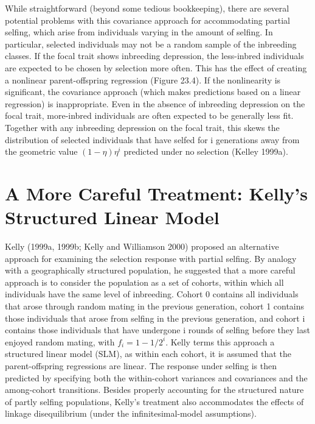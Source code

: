 \documentclass{article}
\begin{document}
While straightforward (beyond some tedious bookkeeping), there are several potential problems with this covariance approach for accommodating partial selfing, which arise from individuals varying in the amount of selfing. In particular, selected individuals may not be a random sample of the inbreeding classes. If the focal trait shows inbreeding depression, the less-inbred individuals are expected to be chosen by selection more often. This has the effect of creating a nonlinear parent-offspring regression (Figure 23.4). If the nonlinearity is significant, the covariance approach (which makes predictions based on a linear regression) is inappropriate. Even in the absence of inbreeding depression on the focal trait, more-inbred individuals are often expected to be generally less fit. Together with any inbreeding depression on the focal trait, this skews the distribution of selected individuals that have selfed for i generations away from the geometric value  $ (1-\eta)\eta^{i} $ predicted under no selection (Kelley 1999a).

\section{A More Careful Treatment: Kelly's Structured Linear Model}
Kelly (1999a, 1999b; Kelly and Williamson 2000) proposed an alternative approach for examining the selection response with partial selfing. By analogy with a geographically structured population, he suggested that a more careful approach is to consider the population as a set of cohorts, within which all individuals have the same level of inbreeding. Cohort 0 contains all individuals that arose through random mating in the previous generation, cohort 1 contains those individuals that arose from selfing in the previous generation, and cohort i contains those individuals that have undergone i rounds of selfing before they last enjoyed random mating, with  $ f_i = 1 - 1/2^i $. Kelly terms this approach a structured linear model (SLM), as within each cohort, it is assumed that the parent-offspring regressions are linear. The response under selfing is then predicted by specifying both the within-cohort variances and covariances and the among-cohort transitions. Besides properly accounting for the structured nature of partly selfing populations, Kelly's treatment also accommodates the effects of linkage disequilibrium (under the infinitesimal-model assumptions).
\end{document}

